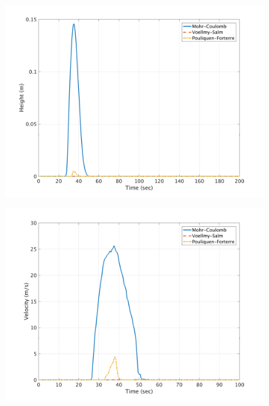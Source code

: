 \documentclass[a4paper,10pt]{article}
\begin{document}
\begin{figure}[H]
	\begin{minipage}[b]{0.5\linewidth}
	\centering
    \includegraphics[width=1\textwidth]{HeightMeans/H7All.png}     
        \label{fig:MFHR_L7}
	\end{minipage}
	\begin{minipage}[b]{0.5\linewidth}
	\centering
    \includegraphics[width=1\textwidth]{VelocityMeans/V7All.png}
        \label{fig:MFVR_L7}
	\end{minipage}
	

\end{figure}
\end{document}
